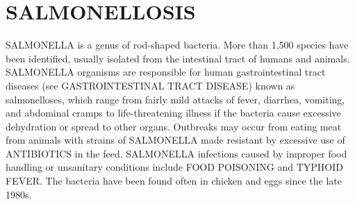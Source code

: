 \section*{SALMONELLOSIS} 
SALMONELLA is a genus of rod-shaped bacteria.  More than 1,500 
species have been identified, usually isolated from the 
intestinal tract of humans and animals.  SALMONELLA organisms 
are responsible for human gastrointestinal tract diseases (see 
GASTROINTESTINAL TRACT DISEASE) known as salmonelloses, which 
range from fairly mild attacks of fever, diarrhea, vomiting, 
and abdominal cramps to life-threatening illness if the 
bacteria cause excessive dehydration or spread to other organs.
Outbreaks may occur from eating meat from animals with strains 
of SALMONELLA made resistant by excessive use of ANTIBIOTICS 
in the feed.  SALMONELLA infections caused by improper food 
handling or unsanitary conditions include FOOD POISONING and 
TYPHOID FEVER.  The bacteria have been found often in chicken 
and eggs since the late 1980s. 



